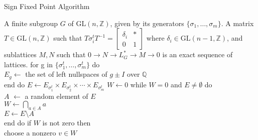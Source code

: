 \documentclass{article}
\theoremstyle{plain}
\theoremstyle{definition}
\newcommand{\Z}{\ensuremath{\mathbb{Z}}}
\newcommand{\Q}{\ensuremath{\mathbb{Q}}}
\begin{document}
\begin{algorithm}[H]
	\caption{Sign Fixed Point Algorithm}
	\label{alg:Sign Fixed Point}
	\begin{algorithmic}[1]
		\REQUIRE A finite subgroup $G$ of $\mathrm{GL}(n,\Z)$, given by its generators $\lbrace \sigma_1, \ldots , \sigma_m \rbrace$.
		\ENSURE A matrix $T \in \mathrm{GL}(n,\Z)$ such that $T \sigma^t_i T^{-1}= \left[ \begin{array}{c|c}
		\delta_i & \ast \\
		\hline 
		0 &1
		\end{array} \right]
		$ where $\delta_i \in \mathrm{GL}(n-1,\Z)$, and sublattices $M, N$ such that $0\longrightarrow N \longrightarrow L^*_G \longrightarrow M \longrightarrow 0$ is an exact sequence of lattices.
		\bigskip
		\STATE	 for g in $\lbrace	\sigma^t_1, \ldots , \sigma^t_m \rbrace$ do\\
		\hspace{0.5 in} $E_g \gets $ the set of left nullspaces of $g \pm I$ over $\Q$\\
		end do
		\STATE $E \gets E_{\sigma^t_1} \times E_{\sigma^t_2} \times \cdots \times E_{\sigma^t_m}$
		\STATE $W \gets 0$
		\STATE while $W = 0$ and $E \neq \emptyset$ do\\
		\hspace{0.5in} $A$ $\gets$ a random element of $E$ \\
	    \hspace{0.5in}$W \gets \bigcap\limits_{a\in A}a$\\
	      \hspace{0.5in}$E \gets E \setminus A$\\
	    end do
	    \STATE if $W $ is not zero then\\
	    \hspace{0.5in} choose a nonzero $v \in W$\\

\end{algorithmic}
\end{algorithm}
\end{document}
